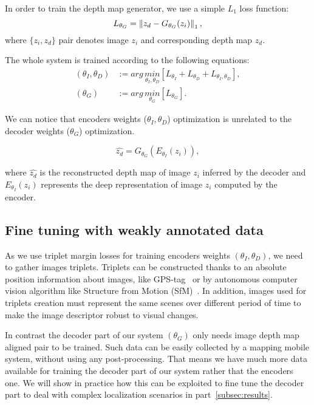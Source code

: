 In order to train the depth map generator, we use a simple $L_1$ loss function:
\begin{equation}
	\label{eq:l1_loss}
	L_{\theta_{G}} = \left\lVert z_d - G_{\theta_{G}}(z_i)\right\rVert_{1},
\end{equation}
where $\{z_i, z_d\}$ pair denotes image $z_i$ and corresponding depth map $z_d$.

The whole system is trained according to the following equations:
\begin{align}
	\label{eq:sys_optimization}
	\left( \theta_{I}, \theta_{D} \right) & := arg\,\underset{\theta_{I}, \theta_{D}}{min} \left[ L_{\theta_{I}} + L_{\theta_{D}} + L_{\theta_{I},\theta_{D}} \right], \\
	\left( \theta_{G} \right) & := arg\,\underset{\theta_{G}}{min} \left[ L_{\theta_{G}} \right]. 
\end{align}

We can notice that encoders weights ($\theta_{I}, \theta_{D}$) optimization is unrelated to the decoder weights ($\theta_{G}$) optimization.

\begin{equation}
	\label{eq:generator}
	\hat{z_d} =  G_{\theta_{G}}(E_{\theta_{I}}(z_i)),
\end{equation}

where $\hat{z_d}$ is the reconstructed depth map of image $z_i$ inferred by the decoder and $E_{\theta_{I}}(z_i)$ represents the deep representation of image $z_i$ computed by the encoder.


\subsection{Fine tuning with weakly annotated data}
\label{subsec:data}
As we use triplet margin losses for training encoders weights $(\theta_{I}, \theta_{D})$, we need to gather images triplets. Triplets can be constructed thanks to an absolute position information about images, like GPS-tag~\cite{Arandjelovic2017,Liu2018} or by autonomous computer vision algorithm like Structure from Motion (SfM)~\cite{Godard2017,Radenovic2017,Kim2017a}. In addition, images used for triplets creation must represent the same scenes over different period of time to make the image descriptor robust to visual changes.

In contrast the decoder part of our system $(\theta_{G})$ only needs image depth map aligned pair to be trained. Such data can be easily collected by a mapping mobile system, without using any post-processing. That means we have much more data available for training the decoder part of our system rather that the encoders one. We will show in practice how this can be exploited to fine tune the decoder part to deal with complex localization scenarios in part~\ref{subsec:results}.

